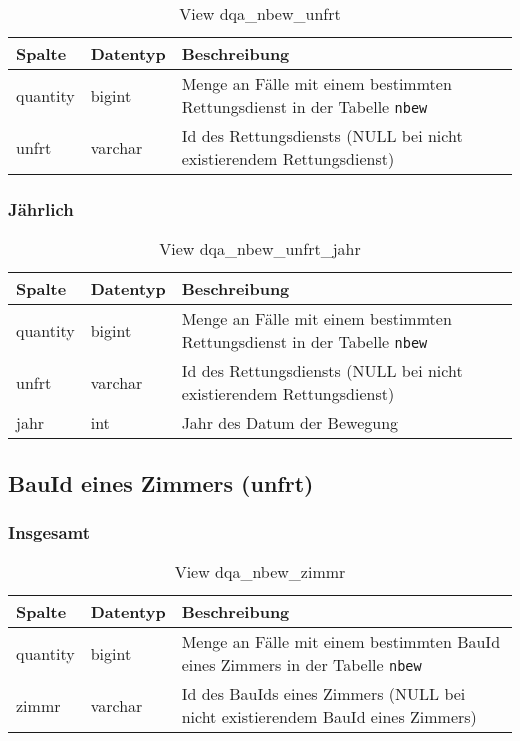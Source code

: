 \begin{table}[ht]
	\centering   
	\caption{View dqa\_nbew\_unfrt}
	\label{tab:bewUnfrtI}
	\begin{tabular}{||l|l|p{10cm}||}   		
		\hline
		Spalte & Datentyp & Beschreibung \\ [0.5ex]
		\hline\hline
		quantity & bigint & Menge an Fälle mit einem bestimmten Rettungsdienst in der Tabelle \texttt{nbew} \\
		\hline
		unfrt & varchar & Id des Rettungsdiensts (NULL bei nicht existierendem Rettungsdienst)\\
		\hline
	\end{tabular}
\end{table}

\subsubsection{Jährlich} \label{subsubsec:bewUnfrtJ}

\begin{table}[ht]
	\centering   
	\caption{View dqa\_nbew\_unfrt\_jahr}
	\label{tab:bewUnfrtJ}
	\begin{tabular}{||l|l|p{10cm}||}
		\hline
		Spalte & Datentyp & Beschreibung \\ [0.5ex]
		\hline\hline
		quantity & bigint & Menge an Fälle mit einem bestimmten Rettungsdienst in der Tabelle \texttt{nbew}\\
		\hline
		unfrt & varchar & Id des Rettungsdiensts (NULL bei nicht existierendem Rettungsdienst)\\
		\hline
		jahr & int &  Jahr des Datum der Bewegung \\
		\hline		
	\end{tabular}
\end{table}

\subsection{BauId eines Zimmers (unfrt)} \label{subsec:bewZimmr}

\subsubsection{Insgesamt} \label{subsubsec:bewZimmrI}

\begin{table}[ht]
	\centering   
	\caption{View dqa\_nbew\_zimmr}
	\label{tab:bewZimmrI}
	\begin{tabular}{||l|l|p{10cm}||}   		
		\hline
		Spalte & Datentyp & Beschreibung \\ [0.5ex]
		\hline\hline
		quantity & bigint & Menge an Fälle mit einem bestimmten BauId eines Zimmers in der Tabelle \texttt{nbew} \\
		\hline
		zimmr & varchar & Id des BauIds eines Zimmers (NULL bei nicht existierendem BauId eines Zimmers)\\
		\hline
	\end{tabular}
\end{table}

